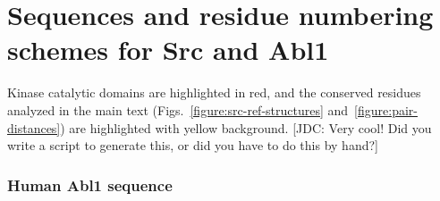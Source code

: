\documentclass[aps,pre,twocolumn,nofootinbib,superscriptaddress,linenumbers]{revtex4-1}
\begin{document}

 



\onecolumngrid
\newpage
\appendix
\setcounter{figure}{0}

\renewcommand{\thesection}{\arabic{section}}
\section{Sequences and residue numbering schemes for Src and Abl1}
\label{si:residue-numbering-schemes}

Kinase catalytic domains are highlighted in red, and the conserved residues analyzed in the main text (Figs.~\ref{figure:src-ref-structures} and~\ref{figure:pair-distances}) are highlighted with yellow background.
{\color{red}[JDC: Very cool!  Did you write a script to generate this, or did you have to do this by hand?]}

\subsubsection*{Human Abl1 sequence}
\end{document}
